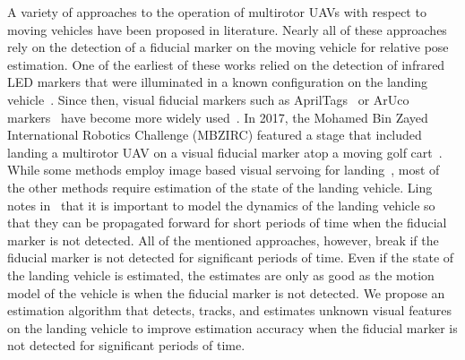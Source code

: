A variety of approaches to the operation of multirotor UAVs with respect to
moving vehicles have been proposed in literature. Nearly all of these approaches rely on the
detection of a fiducial marker on the moving vehicle for relative pose
estimation. One of the earliest of
these works relied on the detection of infrared LED markers that were
illuminated in a known configuration on the landing
vehicle~\cite{wenzel2011automatic}. Since then, visual fiducial markers such as
AprilTags~\cite{olson2011tags} or ArUco markers~\cite{garrido2016generation}
have become more widely
used~\cite{ling2014precision,borowczyk2017autonomous,marantos2018vision,
araar2017vision}.
In 2017, the Mohamed Bin Zayed International Robotics Challenge (MBZIRC)
featured a stage that included landing a multirotor UAV on a visual fiducial
marker atop a moving golf
cart~\cite{baca2019autonomous,falanga2017vision,beul2017fast,cantelli2017autonomous}.
While some methods employ image based visual servoing for
landing~\cite{lee2012autonomous,wynn2019visual}, most of the other methods
require estimation of the state of the landing vehicle. Ling notes in~\cite{ling2014precision} that it is important to model the
dynamics of the landing vehicle so that they can be propagated forward for short
periods of time when the fiducial marker is not
detected. All of the mentioned
approaches, however, break if the fiducial marker is not detected for
significant periods of time.
Even if the state of the landing vehicle is estimated, the estimates are only as
good as the
motion model of the vehicle is when the fiducial marker is not detected. We propose an estimation algorithm that detects,
tracks, and estimates unknown visual features on the landing vehicle to improve
estimation accuracy when the fiducial marker is not detected for significant
periods of time.

